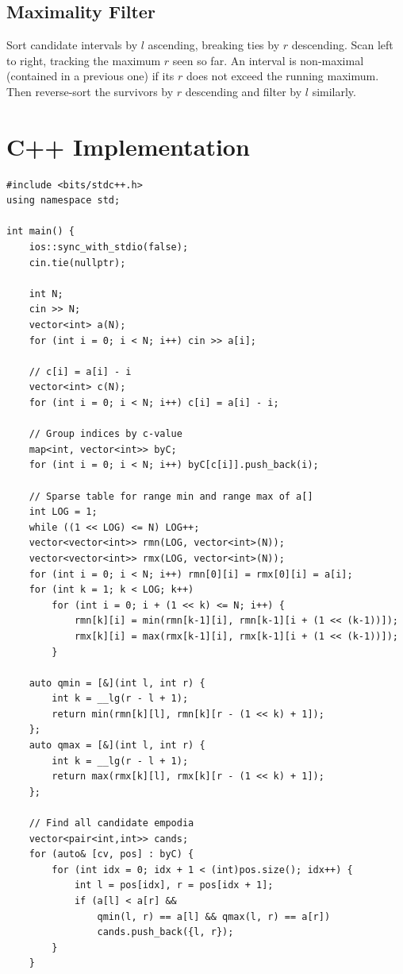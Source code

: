 \documentclass[11pt,a4paper]{article}
\begin{document}
\subsection{Maximality Filter}
Sort candidate intervals by $l$ ascending, breaking ties by $r$
descending. Scan left to right, tracking the maximum $r$ seen so far.
An interval is non-maximal (contained in a previous one) if its $r$ does
not exceed the running maximum. Then reverse-sort the survivors by $r$
descending and filter by $l$ similarly.

\section{C++ Implementation}

\begin{lstlisting}
#include <bits/stdc++.h>
using namespace std;

int main() {
    ios::sync_with_stdio(false);
    cin.tie(nullptr);

    int N;
    cin >> N;
    vector<int> a(N);
    for (int i = 0; i < N; i++) cin >> a[i];

    // c[i] = a[i] - i
    vector<int> c(N);
    for (int i = 0; i < N; i++) c[i] = a[i] - i;

    // Group indices by c-value
    map<int, vector<int>> byC;
    for (int i = 0; i < N; i++) byC[c[i]].push_back(i);

    // Sparse table for range min and range max of a[]
    int LOG = 1;
    while ((1 << LOG) <= N) LOG++;
    vector<vector<int>> rmn(LOG, vector<int>(N));
    vector<vector<int>> rmx(LOG, vector<int>(N));
    for (int i = 0; i < N; i++) rmn[0][i] = rmx[0][i] = a[i];
    for (int k = 1; k < LOG; k++)
        for (int i = 0; i + (1 << k) <= N; i++) {
            rmn[k][i] = min(rmn[k-1][i], rmn[k-1][i + (1 << (k-1))]);
            rmx[k][i] = max(rmx[k-1][i], rmx[k-1][i + (1 << (k-1))]);
        }

    auto qmin = [&](int l, int r) {
        int k = __lg(r - l + 1);
        return min(rmn[k][l], rmn[k][r - (1 << k) + 1]);
    };
    auto qmax = [&](int l, int r) {
        int k = __lg(r - l + 1);
        return max(rmx[k][l], rmx[k][r - (1 << k) + 1]);
    };

    // Find all candidate empodia
    vector<pair<int,int>> cands;
    for (auto& [cv, pos] : byC) {
        for (int idx = 0; idx + 1 < (int)pos.size(); idx++) {
            int l = pos[idx], r = pos[idx + 1];
            if (a[l] < a[r] &&
                qmin(l, r) == a[l] && qmax(l, r) == a[r])
                cands.push_back({l, r});
        }
    }


\end{lstlisting}
\end{document}
